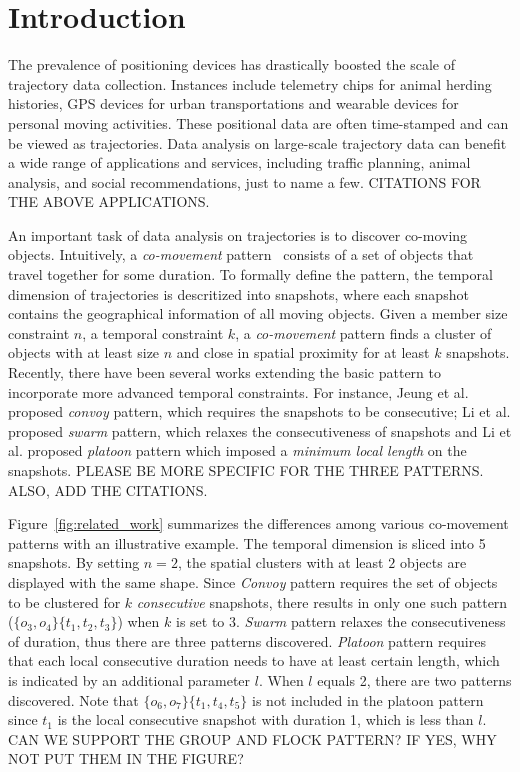 
\section{Introduction}
The prevalence of positioning devices has drastically boosted the scale of trajectory data collection. Instances include telemetry chips for animal herding histories, GPS devices for urban transportations and wearable devices for personal moving activities. These positional data are often time-stamped and can be viewed as trajectories. Data analysis on large-scale trajectory data can benefit a wide range of applications and services, including traffic planning, animal analysis, and social recommendations, just to name a few. CITATIONS FOR THE ABOVE APPLICATIONS.

An important task of data analysis on trajectories is to discover co-moving objects. Intuitively, a \emph{co-movement} pattern~\cite{li2013managing} consists of a set of objects that travel together for some duration. To formally define the pattern, the temporal dimension of trajectories is descritized into snapshots, where each snapshot contains the geographical information of all moving objects. Given a member size constraint $n$, a temporal constraint $k$, a \emph{co-movement} pattern finds a cluster of objects with at least size $n$ and close in spatial proximity for at least $k$ snapshots. Recently, there have been several works extending the basic pattern to incorporate more advanced temporal constraints. For instance, Jeung et al. proposed \emph{convoy} pattern, which requires the snapshots to be consecutive; Li et al. proposed \emph{swarm} pattern, which relaxes the consecutiveness of snapshots and Li et al. proposed \emph{platoon} pattern which imposed a \emph{minimum local length} on the snapshots. PLEASE BE MORE SPECIFIC FOR THE THREE PATTERNS. ALSO, ADD THE CITATIONS.





Figure~\ref{fig:related_work} summarizes the differences among various co-movement patterns with an illustrative example. The temporal dimension is sliced into 5 snapshots. By setting $n=2$, the spatial clusters with at least $2$ objects are displayed with the same shape. Since \emph{Convoy} pattern requires the set of objects to be clustered for $k$ \emph{consecutive} snapshots, there results in only one such pattern ($\{o_3,o_4\}\{t_1,t_2,t_3\}$) when $k$ is set to $3$. \emph{Swarm} pattern relaxes the consecutiveness of duration, thus there are three patterns discovered. \emph{Platoon} pattern requires that each local consecutive duration needs to have at least certain length, which is indicated by an additional parameter $l$. When $l$ equals 2, there are two patterns discovered. Note that $\{o_6,o_7\}\{t_1,t_4,t_5\}$ is not included in the platoon pattern since $t_1$ is the local consecutive snapshot with duration 1, which is less than $l$. CAN WE SUPPORT THE GROUP AND FLOCK PATTERN? IF YES, WHY NOT PUT THEM IN THE FIGURE?

